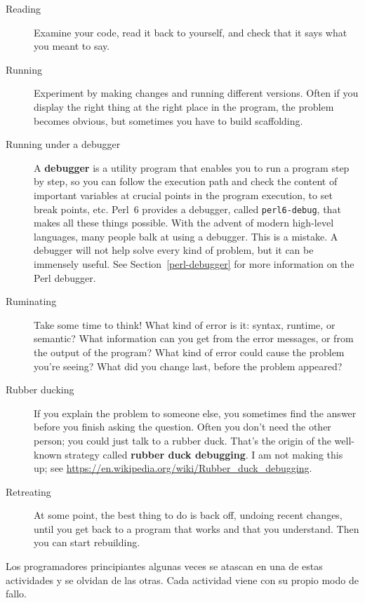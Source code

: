 \begin{description}

\item[Reading] Examine your code, read it back to yourself, and
check that it says what you meant to say.

\item[Running] Experiment by making changes and running different
versions.  Often if you display the right thing at the right place
in the program, the problem becomes obvious, but sometimes you have to
build scaffolding.

\item[Running under a debugger] A {\bf debugger} is a utility 
program that enables you to run a program step by step, 
so you can follow the execution path and check the content of important 
variables at crucial points in the program execution, to set 
break points, etc. Perl~6 provides a debugger, called 
{\tt perl6-debug}, that makes all these things possible. With the 
advent of modern high-level languages, many people balk at 
using a debugger. This is a mistake. A debugger will not help 
solve every kind of problem, but it can be immensely 
useful. See Section~\ref{perl-debugger} for more information
on the Perl debugger.

\item[Ruminating] Take some time to think!  What kind of error
is it: syntax, runtime, or semantic?  What information can you get from
the error messages, or from the output of the program?  What kind of
error could cause the problem you're seeing?  What did you change
last, before the problem appeared?

\item[Rubber ducking] If you explain the problem to someone else, you
sometimes find the answer before you finish asking the question.
Often you don't need the other person; you could just talk to a rubber
duck.  That's the origin of the well-known strategy called {\bf
rubber duck debugging}.  I am not making this up; see 
\url{https://en.wikipedia.org/wiki/Rubber_duck_debugging}.

\item[Retreating] At some point, the best thing to do is back
off, undoing recent changes, until you get back to a program that
works and that you understand.  Then you can start rebuilding.

\end{description}

Los programadores principiantes algunas veces se atascan en una de
estas actividades y se olvidan de las otras. Cada actividad viene
con su propio modo de fallo.

